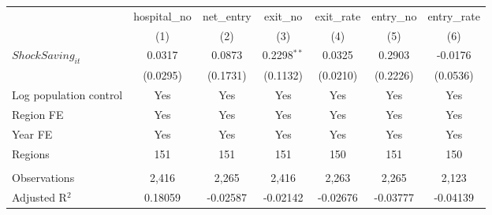 \begingroup
\centering
\begin{tabular}{lcccccc}
   \toprule
                          & hospital\_no  & net\_entry  & exit\_no      & exit\_rate  & entry\_no  & entry\_rate \\    
                          & (1)           & (2)         & (3)           & (4)         & (5)        & (6)\\  
   \midrule 
   $ShockSaving_{it}$     & 0.0317        & 0.0873      & 0.2298$^{**}$ & 0.0325      & 0.2903     & -0.0176\\   
                          & (0.0295)      & (0.1731)    & (0.1132)      & (0.0210)    & (0.2226)   & (0.0536)\\   
   Log population control & Yes           & Yes         & Yes           & Yes         & Yes        & Yes\\  
   Region FE              & Yes           & Yes         & Yes           & Yes         & Yes        & Yes\\  
   Year FE                & Yes           & Yes         & Yes           & Yes         & Yes        & Yes\\  
   Regions                & 151           & 151         & 151           & 150         & 151        & 150\\  
    \\
   Observations           & 2,416         & 2,265       & 2,416         & 2,263       & 2,265      & 2,123\\  
   Adjusted R$^2$         & 0.18059       & -0.02587    & -0.02142      & -0.02676    & -0.03777   & -0.04139\\  
   \bottomrule
\end{tabular}
\par\endgroup
